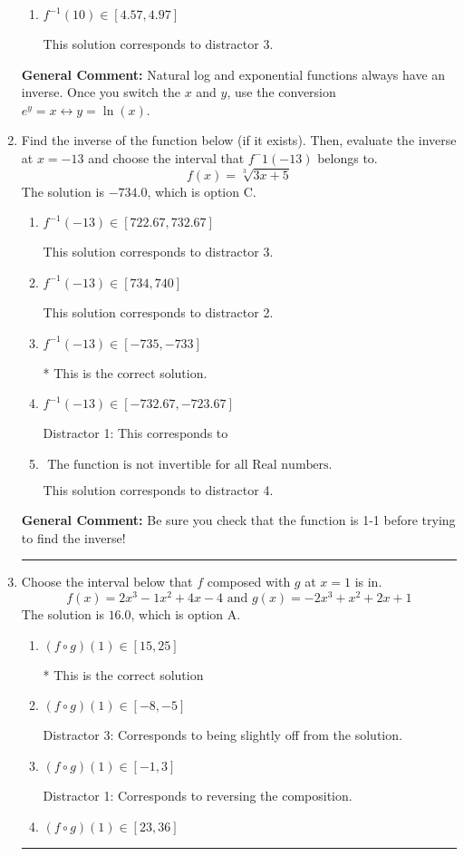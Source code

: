 \documentclass{extbook}[14pt]
\newcommand{\litem}[1]{\item #1

\rule{\textwidth}{0.4pt}}
\begin{document}
\begin{enumerate}
{\begin{enumerate}[label=\Alph*.]
 This solution corresponds to distractor 2.
\item \( f^{-1}(10) \in [4.57, 4.97] \)

 This solution corresponds to distractor 3.
\end{enumerate}

\textbf{General Comment:} Natural log and exponential functions always have an inverse. Once you switch the $x$ and $y$, use the conversion $ e^y = x \leftrightarrow y=\ln(x)$.
}
\litem{
Find the inverse of the function below (if it exists). Then, evaluate the inverse at $x = -13$ and choose the interval that $f^-1(-13)$ belongs to.
\[ f(x) = \sqrt[3]{3 x + 5} \]The solution is \( -734.0 \), which is option C.\begin{enumerate}[label=\Alph*.]
\item \( f^{-1}(-13) \in [722.67, 732.67] \)

 This solution corresponds to distractor 3.
\item \( f^{-1}(-13) \in [734, 740] \)

 This solution corresponds to distractor 2.
\item \( f^{-1}(-13) \in [-735, -733] \)

* This is the correct solution.
\item \( f^{-1}(-13) \in [-732.67, -723.67] \)

 Distractor 1: This corresponds to 
\item \( \text{ The function is not invertible for all Real numbers. } \)

 This solution corresponds to distractor 4.
\end{enumerate}

\textbf{General Comment:} Be sure you check that the function is 1-1 before trying to find the inverse!
}
\litem{
Choose the interval below that $f$ composed with $g$ at $x=1$ is in.
\[ f(x) = 2x^{3} -1 x^{2} +4 x -4 \text{ and } g(x) = -2x^{3} + x^{2} +2 x + 1 \]The solution is \( 16.0 \), which is option A.\begin{enumerate}[label=\Alph*.]
\item \( (f \circ g)(1) \in [15, 25] \)

* This is the correct solution
\item \( (f \circ g)(1) \in [-8, -5] \)

 Distractor 3: Corresponds to being slightly off from the solution.
\item \( (f \circ g)(1) \in [-1, 3] \)

 Distractor 1: Corresponds to reversing the composition.
\item \( (f \circ g)(1) \in [23, 36] \)


\end{enumerate}}
\end{enumerate}
\end{document}
